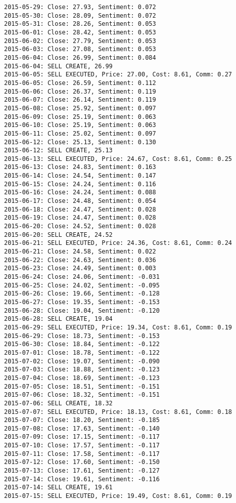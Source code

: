 \documentclass[11pt]{article}
\begin{document}
\begin{Verbatim}[commandchars=\\\{\}]
2015-05-29: Close: 27.93, Sentiment: 0.072
2015-05-30: Close: 28.09, Sentiment: 0.072
2015-05-31: Close: 28.26, Sentiment: 0.053
2015-06-01: Close: 28.42, Sentiment: 0.053
2015-06-02: Close: 27.79, Sentiment: 0.053
2015-06-03: Close: 27.08, Sentiment: 0.053
2015-06-04: Close: 26.99, Sentiment: 0.084
2015-06-04: SELL CREATE, 26.99
2015-06-05: SELL EXECUTED, Price: 27.00, Cost: 8.61, Comm: 0.27
2015-06-05: Close: 26.59, Sentiment: 0.112
2015-06-06: Close: 26.37, Sentiment: 0.119
2015-06-07: Close: 26.14, Sentiment: 0.119
2015-06-08: Close: 25.92, Sentiment: 0.097
2015-06-09: Close: 25.19, Sentiment: 0.063
2015-06-10: Close: 25.19, Sentiment: 0.063
2015-06-11: Close: 25.02, Sentiment: 0.097
2015-06-12: Close: 25.13, Sentiment: 0.130
2015-06-12: SELL CREATE, 25.13
2015-06-13: SELL EXECUTED, Price: 24.67, Cost: 8.61, Comm: 0.25
2015-06-13: Close: 24.83, Sentiment: 0.163
2015-06-14: Close: 24.54, Sentiment: 0.147
2015-06-15: Close: 24.24, Sentiment: 0.116
2015-06-16: Close: 24.24, Sentiment: 0.088
2015-06-17: Close: 24.48, Sentiment: 0.054
2015-06-18: Close: 24.47, Sentiment: 0.028
2015-06-19: Close: 24.47, Sentiment: 0.028
2015-06-20: Close: 24.52, Sentiment: 0.028
2015-06-20: SELL CREATE, 24.52
2015-06-21: SELL EXECUTED, Price: 24.36, Cost: 8.61, Comm: 0.24
2015-06-21: Close: 24.58, Sentiment: 0.022
2015-06-22: Close: 24.63, Sentiment: 0.036
2015-06-23: Close: 24.49, Sentiment: 0.003
2015-06-24: Close: 24.06, Sentiment: -0.031
2015-06-25: Close: 24.02, Sentiment: -0.095
2015-06-26: Close: 19.66, Sentiment: -0.128
2015-06-27: Close: 19.35, Sentiment: -0.153
2015-06-28: Close: 19.04, Sentiment: -0.120
2015-06-28: SELL CREATE, 19.04
2015-06-29: SELL EXECUTED, Price: 19.34, Cost: 8.61, Comm: 0.19
2015-06-29: Close: 18.73, Sentiment: -0.153
2015-06-30: Close: 18.84, Sentiment: -0.122
2015-07-01: Close: 18.78, Sentiment: -0.122
2015-07-02: Close: 19.07, Sentiment: -0.090
2015-07-03: Close: 18.88, Sentiment: -0.123
2015-07-04: Close: 18.69, Sentiment: -0.123
2015-07-05: Close: 18.51, Sentiment: -0.151
2015-07-06: Close: 18.32, Sentiment: -0.151
2015-07-06: SELL CREATE, 18.32
2015-07-07: SELL EXECUTED, Price: 18.13, Cost: 8.61, Comm: 0.18
2015-07-07: Close: 18.20, Sentiment: -0.185
2015-07-08: Close: 17.63, Sentiment: -0.140
2015-07-09: Close: 17.15, Sentiment: -0.117
2015-07-10: Close: 17.57, Sentiment: -0.117
2015-07-11: Close: 17.58, Sentiment: -0.117
2015-07-12: Close: 17.60, Sentiment: -0.150
2015-07-13: Close: 17.61, Sentiment: -0.127
2015-07-14: Close: 19.61, Sentiment: -0.116
2015-07-14: SELL CREATE, 19.61
2015-07-15: SELL EXECUTED, Price: 19.49, Cost: 8.61, Comm: 0.19

\end{Verbatim}
\end{document}

